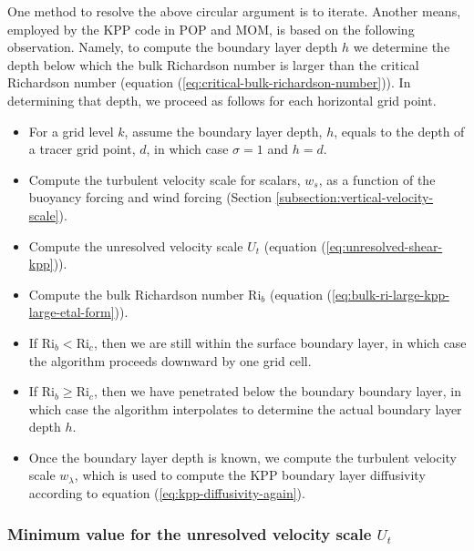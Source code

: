 One method to resolve the above circular argument is to iterate.
Another means, employed by the KPP code in POP and MOM, is based on
the following observation.  Namely, to compute the boundary layer
depth $h$ we determine the depth below which the bulk Richardson
number is larger than the critical Richardson number (equation
(\ref{eq:critical-bulk-richardson-number})).  In determining that
depth, we proceed as follows for each horizontal grid point.
\begin{itemize}

\item For a grid level $k$, assume the boundary layer depth, $h$,
  equals to the depth of a tracer grid point, $d$, in which case
  $\sigma = 1$ and $h = d$.

\item Compute the turbulent velocity scale for scalars, $w_{s}$, as a
  function of the buoyancy forcing and wind forcing (Section
  \ref{subsection:vertical-velocity-scale}).

\item Compute the unresolved velocity scale $U_{t}$ (equation
  (\ref{eq:unresolved-shear-kpp})).

\item Compute the bulk Richardson number $\mbox{Ri}_{b}$ (equation
  (\ref{eq:bulk-ri-large-kpp-large-etal-form})).

\item If $\mbox{Ri}_{b} < \mbox{Ri}_{c}$, then we are still within the
  surface boundary layer, in which case the algorithm proceeds
  downward by one grid cell.

\item If $\mbox{Ri}_{b} \ge \mbox{Ri}_{c}$, then we have penetrated
  below the boundary boundary layer, in which case the algorithm
  interpolates to determine the actual boundary layer depth $h$.

\item Once the boundary layer depth is known, we compute the turbulent
  velocity scale $w_{\lambda}$, which is used to compute the KPP
  boundary layer diffusivity according to equation
  (\ref{eq:kpp-diffusivity-again}).

\end{itemize}

\subsubsection{Minimum value for the unresolved velocity scale $U_{t}$}

